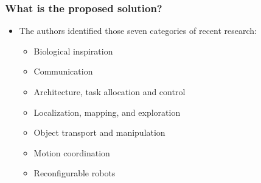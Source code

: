 \documentclass{article}
\begin{document}
\subsubsection*{What is the proposed solution?}
\begin{itemize}
    \item The authors identified those seven categories of recent research: \ 
    \begin{itemize}
        \item Biological inspiration
        \item Communication
        \item Architecture, task allocation and control
        \item Localization, mapping, and exploration
        \item Object transport and manipulation
        \item Motion coordination 
        \item Reconfigurable robots
    \end{itemize}
\end{itemize}
\end{document}
